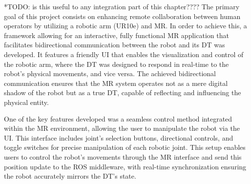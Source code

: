 
    

*TODO: is this useful to any integration part of this chapter???? 
The primary goal of this project consists on enhancing remote collaboration between human operators by utilizing a robotic arm (UR10e) and \ac{MR}. In order to achieve this, a framework allowing for an interactive, fully functional \ac{MR} application that facilitates bidirectional communication between the robot and its \ac{DT} was developed. It features a friendly \ac{UI} that enables the visualization and control of the robotic arm, where the \ac{DT} was designed to respond in real-time to the robot's physical movements, and vice versa. The achieved bidirectional communication ensures that the \ac{MR} system operates not as a mere digital shadow of the robot but as a true \ac{DT}, capable of reflecting and influencing the physical entity.

One of the key features developed was a seamless control method integrated within the \ac{MR} environment, allowing the user to manipulate the robot via the \ac{UI}. This interface includes joint's selection buttons, directional controls, and toggle switches for precise manipulation of each robotic joint.  This setup enables users to control the robot's movements through the \ac{MR} interface and send this position update to the \ac{ROS} middleware, with real-time synchronization ensuring the robot accurately mirrors the \ac{DT}'s state.

